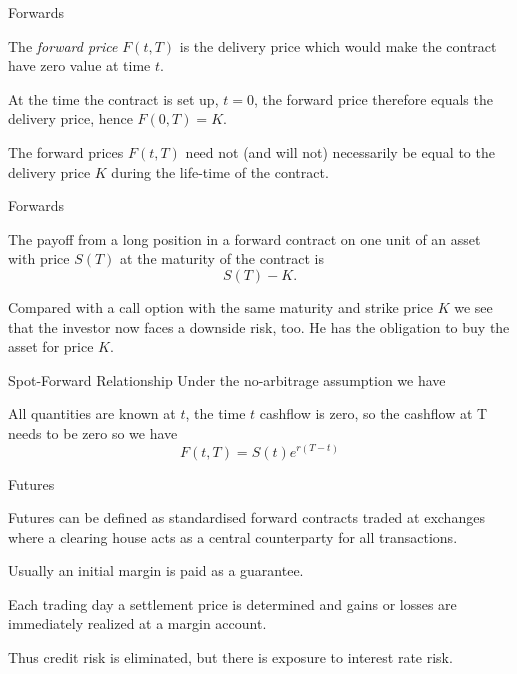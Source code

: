 {Forwards}
\item<1-> The {\it forward
price} $F(t,T)$ is the delivery price which would make the
contract have zero value at time $t$.
\item<2-> At the time the contract is set up, $t=0$,
the forward price therefore equals the delivery price, hence
$F(0,T) = K$.
\item<3->
The forward prices $F(t,T)$ need not (and will not)
necessarily be equal to the delivery price $K$ during the
life-time of the contract.

{Forwards}
\item<1->
The payoff from a long position in a forward contract on one unit
of an asset with price $S(T)$ at the maturity of the contract is
$$ S(T)-K.$$
\item<2-> Compared with a call option with the same maturity
and strike price $K$ we see that the investor now faces a downside
risk, too. He has the obligation to buy the asset for price $K$.

{Spot-Forward Relationship}
Under the no-arbitrage assumption we have

\begin{center}
\end{center}

All quantities are known at $t$, the time $t$ cashflow is zero, so the cashflow at T needs to be zero so we have $$F(t,T) = S(t)e^{r(T-t)}$$

{Futures}
\item<1-> Futures can be defined as standardised forward contracts traded at exchanges where a clearing house acts as a central counterparty for all transactions.
\item<2-> Usually an initial margin is paid as a guarantee.
\item<3-> Each trading day a settlement price is determined and gains or losses are immediately realized at a margin account.
\item<4-> Thus credit risk is eliminated, but there is exposure to interest rate risk.

